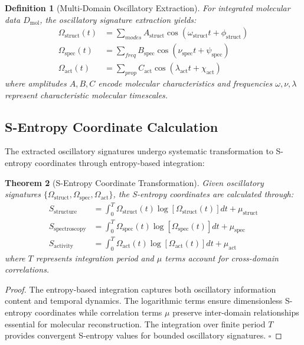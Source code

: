 \documentclass[12pt,a4paper]{article}
\newtheorem{theorem}{Theorem}[section]
\newtheorem{definition}[theorem]{Definition}
\begin{document}
\begin{definition}[Multi-Domain Oscillatory Extraction]
For integrated molecular data $D_{\text{mol}}$, the oscillatory signature extraction yields:
\begin{align}
\Omega_{\text{struct}}(t) &= \sum_{modes} A_{\text{struct}} \cos(\omega_{\text{struct}} t + \phi_{\text{struct}}) \\
\Omega_{\text{spec}}(t) &= \sum_{freq} B_{\text{spec}} \cos(\nu_{\text{spec}} t + \psi_{\text{spec}}) \\
\Omega_{\text{act}}(t) &= \sum_{prop} C_{\text{act}} \cos(\lambda_{\text{act}} t + \chi_{\text{act}})
\end{align}
where amplitudes $A, B, C$ encode molecular characteristics and frequencies $\omega, \nu, \lambda$ represent characteristic molecular timescales.
\end{definition}

\subsection{S-Entropy Coordinate Calculation}

The extracted oscillatory signatures undergo systematic transformation to S-entropy coordinates through entropy-based integration:

\begin{theorem}[S-Entropy Coordinate Transformation]
Given oscillatory signatures $\{\Omega_{\text{struct}}, \Omega_{\text{spec}}, \Omega_{\text{act}}\}$, the S-entropy coordinates are calculated through:
\begin{align}
S_{\text{structure}} &= \int_0^T \Omega_{\text{struct}}(t) \log[\Omega_{\text{struct}}(t)] dt + \mu_{\text{struct}} \\
S_{\text{spectroscopy}} &= \int_0^T \Omega_{\text{spec}}(t) \log[\Omega_{\text{spec}}(t)] dt + \mu_{\text{spec}} \\
S_{\text{activity}} &= \int_0^T \Omega_{\text{act}}(t) \log[\Omega_{\text{act}}(t)] dt + \mu_{\text{act}}
\end{align}
where $T$ represents integration period and $\mu$ terms account for cross-domain correlations.
\end{theorem}

\begin{proof}
The entropy-based integration captures both oscillatory information content and temporal dynamics. The logarithmic terms ensure dimensionless S-entropy coordinates while correlation terms $\mu$ preserve inter-domain relationships essential for molecular reconstruction. The integration over finite period $T$ provides convergent S-entropy values for bounded oscillatory signatures. $\square$
\end{proof}
\end{document}
